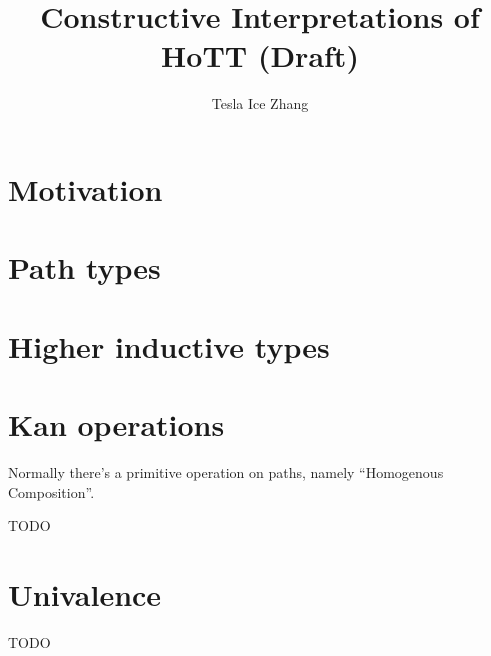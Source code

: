 \documentclass{article}
\title{Constructive Interpretations of HoTT (Draft)}
\author{Tesla Ice Zhang}
\newcommand{\TODO}[0]{{\color{red} TODO}}
\begin{document}
\maketitle

\tableofcontents

\section{Motivation}
\label{sec:motivation}


\section{Path types}
\label{sec:path}


\section{Higher inductive types}
\label{sec:hit}


\section{Kan operations}
\label{sec:kan}

Normally there's a primitive operation on paths,
namely ``Homogenous Composition''.

\TODO

\section{Univalence}
\label{sec:ua}

\TODO



\end{document}
